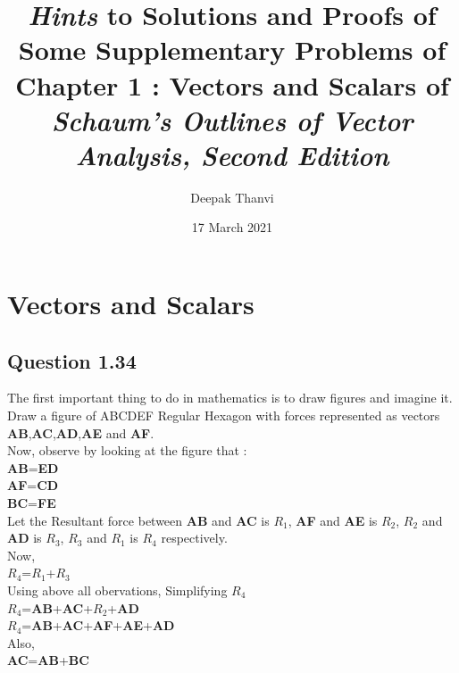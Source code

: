 \documentclass{article}
\title{\textit{Hints} to Solutions and Proofs of Some Supplementary Problems of Chapter 1 : \textbf{Vectors and Scalars} of \textit{Schaum's Outlines of Vector Analysis, Second Edition}}
\author{Deepak Thanvi}
\date{17 March 2021}
\begin{document}
\maketitle

\section{Vectors and Scalars}

	\subsection{Question 1.34}
	
	The first important thing to do in mathematics is to draw figures and imagine it.\\
	Draw a figure of ABCDEF Regular Hexagon with forces represented as vectors \textbf{AB},\textbf{AC},\textbf{AD},\textbf{AE} and \textbf{AF}.\\
	
	Now, observe by looking at the figure that :\\
	
	\textbf{AB}=\textbf{ED} \\
	
	\textbf{AF}=\textbf{CD} \\
	
	\textbf{BC}=\textbf{FE} \\
	 
	Let the Resultant force between \textbf{AB} and \textbf{AC} is \textbf{$R_{1}$}, \textbf{AF} and 				\textbf{AE} is \textbf{$R_{2}$}, \textbf{$R_{2}$} and \textbf{AD} is \textbf{$R_{3}$}, \textbf{$R_{3}$} 		and \textbf{$R_{1}$} is \textbf{$R_{4}$} respectively.\\
	
	Now,\\
	\textbf{$R_{4}$}=\textbf{$R_{1}$}+\textbf{$R_{3}$} \\
	
	Using above all obervations, Simplifying \textbf{$R_{4}$} \\
	
	\textbf{$R_{4}$}=\textbf{AB}+\textbf{AC}+\textbf{$R_{2}$}+\textbf{AD}\\
	
	\textbf{$R_{4}$}=\textbf{AB}+\textbf{AC}+\textbf{AF}+\textbf{AE}+\textbf{AD} \\
	
	Also, \\
	\textbf{AC}=\textbf{AB}+\textbf{BC}\\
	
\end{document}
